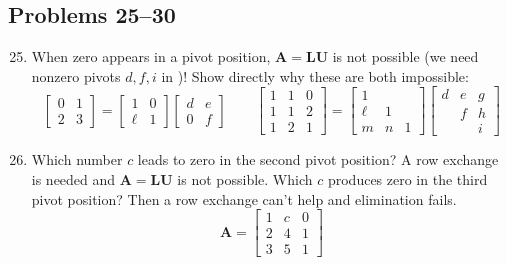 \begin{itemize}
    \subsection{Problems 25--30}
    \begin{enumerate}\setcounter{enumi}{24}\color{foreground-2}
      \item When zero appears in a pivot position, \(\bm{A} = \bm{LU}\) is not
        possible (we need nonzero pivots \( d,f,i \) in )! Show directly
        why these are both impossible:
        \[%
        \begin{bmatrix}
        0 & 1  \\
        2 & 3
        \end{bmatrix} =
        \begin{bmatrix}
        1 & 0 \\
        \ell & 1
        \end{bmatrix}
        \begin{bmatrix}
        d & e \\
        0 & f
        \end{bmatrix} \qquad
        \begin{bmatrix}
        1 & 1 & 0 \\
        1 & 1 & 2 \\
        1 & 2 & 1
        \end{bmatrix} =
        \begin{bmatrix}
        1 &  &  \\
        \ell & 1 &  \\
        m & n & 1
        \end{bmatrix}
        \begin{bmatrix}
        d & e & g \\
         & f & h  \\
         &  & i
        \end{bmatrix}
        \]%

      \item Which number \(c\) leads to zero in the second pivot position? A row
        exchange is needed and \(\bm{A} = \bm{LU}\) is not possible. Which \(c\)
        produces zero in the third pivot position? Then a  row exchange can't
        help and elimination fails.
        \[%
        \bm{A} = \begin{bmatrix}
        1 & c & 0 \\
        2 & 4 & 1 \\
        3 & 5 & 1
        \end{bmatrix}
        \]%


\end{enumerate}
\end{itemize}
